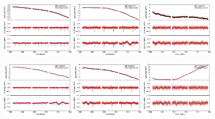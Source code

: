 \documentclass[12pt, preprint]{aastex}
\begin{document}
\begin{figure}[p]
\begin{center}
\includegraphics[width=0.32\textwidth]{f5a}
\hfill
\includegraphics[width=0.32\textwidth]{f5b}
\hfill
\includegraphics[width=0.32\textwidth]{f5c}


\includegraphics[width=0.32\textwidth]{f5d}
\hfill
\includegraphics[width=0.32\textwidth]{f5e}
\hfill
\includegraphics[width=0.32\textwidth]{f5f}



\end{center}
\end{figure}
\end{document}
